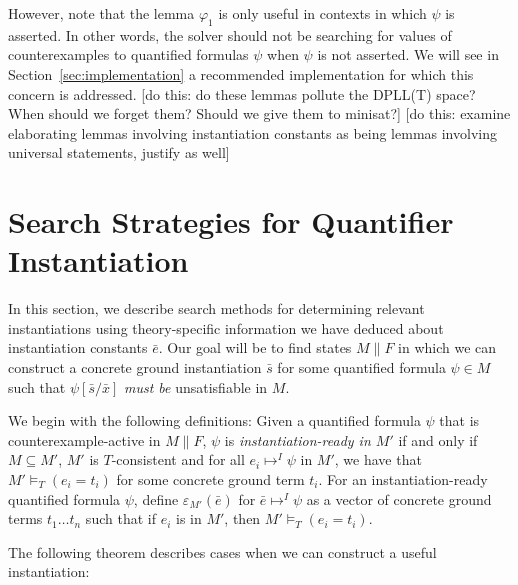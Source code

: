 \documentclass{llncs}
\begin{document}
However, note that the lemma $\varphi_1$ is only useful in contexts in which $\psi$ is asserted.
In other words, the solver should not be searching for values of counterexamples to quantified formulas $\psi$ when $\psi$ is not asserted.
We will see in Section~\ref{sec:implementation} a recommended implementation for which this concern is addressed.
[do this: do these lemmas pollute the DPLL(T) space?  When should we forget them?  Should we give them to minisat?]
[do this: examine elaborating lemmas involving instantiation constants as being lemmas involving universal statements, justify as well]

\section{Search Strategies for Quantifier Instantiation}

In this section, we describe search methods for determining relevant instantiations using theory-specific information we have deduced about instantiation constants $\bar{e}$.
Our goal will be to find states $M \parallel F$ in which we can construct a concrete ground instantiation $\bar{s}$ for some quantified formula $\psi \in M$ such that $\psi [\bar{s}/\bar{x}]$ \emph{must be} unsatisfiable in $M$.

We begin with the following definitions:
Given a quantified formula $\psi$ that is counterexample-active in $M \parallel F$, $\psi$ is \emph{instantiation-ready in $M'$} if and only if $M \subseteq M'$, $M'$ is $T$-consistent and for all $e_i \mapsto^I \psi$ in $M'$, we have that $M' \models_T (e_i = t_i)$ for some concrete ground term $t_i$.
For an instantiation-ready quantified formula $\psi$, define $\varepsilon_{M'}( \bar{e} )$ for $\bar{e} \mapsto^I \psi$ as a vector of concrete ground terms $t_1 \ldots t_n$ such that if $e_i$ is in $M'$, then $M' \models_T (e_i = t_i)$.

The following theorem describes cases when we can construct a useful instantiation:
\end{document}
